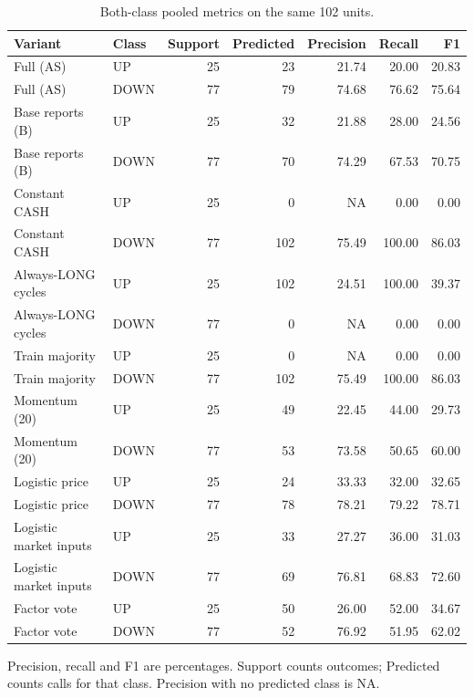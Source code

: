 \begin{table}[htbp]
\centering\small
\caption{Both-class pooled metrics on the same 102 units.}
\label{tab:r1_common_classes}
\setlength{\tabcolsep}{3.5pt}
\begin{tabular}{llrrrrr}
\hline
Variant & Class & Support & Predicted & Precision & Recall & F1 \\
\hline
Full (AS) & UP & 25 & 23 & 21.74 & 20.00 & 20.83 \\
Full (AS) & DOWN & 77 & 79 & 74.68 & 76.62 & 75.64 \\
Base reports (B) & UP & 25 & 32 & 21.88 & 28.00 & 24.56 \\
Base reports (B) & DOWN & 77 & 70 & 74.29 & 67.53 & 70.75 \\
Constant CASH & UP & 25 & 0 & NA & 0.00 & 0.00 \\
Constant CASH & DOWN & 77 & 102 & 75.49 & 100.00 & 86.03 \\
Always-LONG cycles & UP & 25 & 102 & 24.51 & 100.00 & 39.37 \\
Always-LONG cycles & DOWN & 77 & 0 & NA & 0.00 & 0.00 \\
Train majority & UP & 25 & 0 & NA & 0.00 & 0.00 \\
Train majority & DOWN & 77 & 102 & 75.49 & 100.00 & 86.03 \\
Momentum (20) & UP & 25 & 49 & 22.45 & 44.00 & 29.73 \\
Momentum (20) & DOWN & 77 & 53 & 73.58 & 50.65 & 60.00 \\
Logistic price & UP & 25 & 24 & 33.33 & 32.00 & 32.65 \\
Logistic price & DOWN & 77 & 78 & 78.21 & 79.22 & 78.71 \\
Logistic market inputs & UP & 25 & 33 & 27.27 & 36.00 & 31.03 \\
Logistic market inputs & DOWN & 77 & 69 & 76.81 & 68.83 & 72.60 \\
Factor vote & UP & 25 & 50 & 26.00 & 52.00 & 34.67 \\
Factor vote & DOWN & 77 & 52 & 76.92 & 51.95 & 62.02 \\
\hline
\end{tabular}
\par\smallskip\footnotesize Precision, recall and F1 are percentages. Support counts outcomes; Predicted counts calls for that class. Precision with no predicted class is NA.
\end{table}
